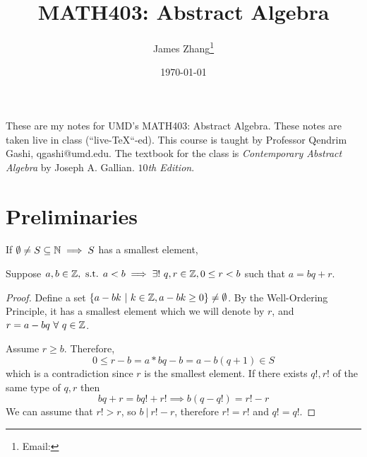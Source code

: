\documentclass[12pt]{scrartcl}
\begin{document}
\title{MATH403: Abstract Algebra}
\author{James Zhang\thanks{Email: }}
\date{\today}




\maketitle
These are my notes for UMD's MATH403: Abstract Algebra. These notes are taken live in class 
(``live-\TeX``-ed). This course is taught by Professor Qendrim Gashi, qgashi@umd.edu. The textbook for the class is 
\textit{Contemporary Abstract Algebra} by Joseph A. Gallian. \textit{$10$th Edition}.
\tableofcontents

\newpage

\section{Preliminaries}

\begin{definition}
  If $\emptyset \neq S \subseteq \mathbb N \implies S$ has a smallest element, 
\end{definition}

\begin{theorem}
  Suppose $a, b \in \mathbb Z, \text{ s.t. } a < b \implies \exists! \  q, r \in \mathbb Z, 0 \leq r < b$ 
  such that $a = bq + r$.

  \begin{proof}

    \hfill

    Define a set $\{a - bk \ | \ k \in \mathbb Z, a - bk \geq 0\} \neq \emptyset$. By the Well-Ordering Principle, 
    it has a smallest element which we will denote by $r$, and $r = a - bq \ \forall \ q \in \mathbb Z$.

    Assume $r \geq b$. Therefore, 
    \[0 \leq r - b = a * bq - b = a - b(q+1) \in S\]
    which is a contradiction since $r$ is the smallest element. If there exists $q!, r!$ of the same 
    type of $q, r$ then 
    \[bq + r = bq! + r! \implies b(q - q!) = r! - r\]
    We can assume that $r! > r$, so $b \ | \ r! - r$, therefore $r! = r!$ and $q! = q!$.
  \end{proof}
\end{theorem}
\end{document}
